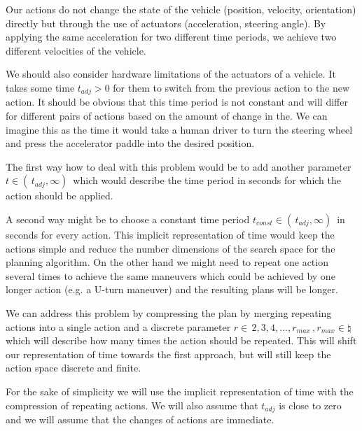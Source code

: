 Our actions do not change the state of the vehicle (position, velocity, orientation) directly but through the use of actuators (acceleration, steering angle). By applying the same acceleration for two different time periods, we achieve two different velocities of the vehicle.

We should also consider hardware limitations of the actuators of a vehicle. It takes some time $t_{adj} > 0$ for them to switch from the previous action to the new action. It should be obvious that this time period is not constant and will differ for different pairs of actions based on the amount of change in the. We can imagine this as the time it would take a human driver to turn the steering wheel and press the accelerator paddle into the desired position.

The first way how to deal with this problem would be to add another parameter $t \in ( \, t_{adj}, \infty ) \,$ which would describe the time period in seconds for which the action should be applied.

A second way might be to choose a constant time period $t_{const} \in ( \, t_{adj}, \infty ) \,$ in seconds for every action. This implicit representation of time would keep the actions simple and reduce the number dimensions of the search space for the planning algorithm. On the other hand we might need to repeat one action several times to achieve the same maneuvers which could be achieved by one longer action (e.g. a U-turn maneuver) and the resulting plans will be longer.

We can address this problem by compressing the plan by merging repeating actions into a single action and a discrete parameter $r \in { \, 2, 3, 4, ..., r_{max} } \,, r_{max} \in \natural$ which will describe how many times the action should be repeated. This will shift our representation of time towards the first approach, but will still keep the action space discrete and finite.

For the sake of simplicity we will use the implicit representation of time with the compression of repeating actions. We will also assume that $t_{adj}$ is close to zero and we will assume that the changes of actions are immediate.